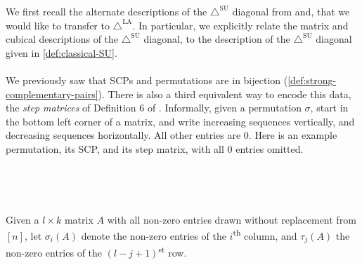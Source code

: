 \documentclass{amsart}
\theoremstyle{definition}
\newcommand{\ordinal}{\textsuperscript{th}} %
\newcommand{\ordinalst}{\textsuperscript{st}} %
\newcommand{\SUD}{\triangle^{\mathrm{SU}}}
\newcommand{\LAD}{\triangle^{\mathrm{LA}}}
\begin{document}
We first recall the alternate descriptions of the $\SUD$ diagonal from \cite{SaneblidzeUmble} and\cite{SaneblidzeUmble-comparingDiagonals}, that we would like to transfer to $\LAD$. 
In particular, we explicitly relate the matrix and cubical descriptions of the $\SUD$ diagonal, to the description of the $\SUD$ diagonal given in \cref{def:classical-SU}.
\\\\
We previously saw that SCPs and permutations are in bijection (\cref{def:strong-complementary-pairs}). 
There is also a third equivalent way to encode this data, the \emph{step matrices} of Definition 6 of \cite{SaneblidzeUmble}.
Informally, given a permutation $\sigma$, start in the bottom left corner of a matrix, and write increasing sequences vertically, and decreasing sequences horizontally. All other entries are $0$. Here is an example permutation, its SCP, and its step matrix, with all $0$ entries omitted.
{\small
\begin{center}
$\quad \quad$
$\quad \quad$
\end{center}
}
Given a $l\times k$ matrix $A$ with all non-zero entries drawn without replacement from $[n]$, let $\sigma_i(A)$ denote the non-zero entries of the $i$\ordinal{} column, and $\tau_j(A)$ the non-zero entries of the $(l-j+1)$\ordinalst{} row. 
\end{document}
